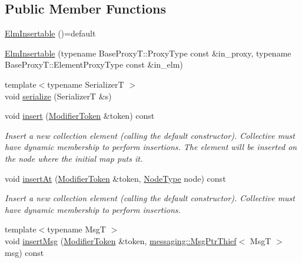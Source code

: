 \subsection*{Public Member Functions}
\begin{DoxyCompactItemize}
\item 
\hyperlink{structvt_1_1vrt_1_1collection_1_1_elm_insertable_a0a5528f369218ac386c4ab521bebffdd}{Elm\+Insertable} ()=default
\item 
\hyperlink{structvt_1_1vrt_1_1collection_1_1_elm_insertable_adbe57f67f3d9648a9ec8434ecdde0bd6}{Elm\+Insertable} (typename Base\+Proxy\+T\+::\+Proxy\+Type const \&in\+\_\+proxy, typename Base\+Proxy\+T\+::\+Element\+Proxy\+Type const \&in\+\_\+elm)
\item 
{\footnotesize template$<$typename SerializerT $>$ }\\void \hyperlink{structvt_1_1vrt_1_1collection_1_1_elm_insertable_a5d4a505bd59521679dd69cf835c67f85}{serialize} (SerializerT \&s)
\item 
void \hyperlink{structvt_1_1vrt_1_1collection_1_1_elm_insertable_a194756166f6728c3992f08b1bbf72ee1}{insert} (\hyperlink{structvt_1_1vrt_1_1collection_1_1_modifier_token}{Modifier\+Token} \&token) const
\begin{DoxyCompactList}\small\item\em Insert a new collection element (calling the default constructor). Collective must have dynamic membership to perform insertions. The element will be inserted on the node where the initial map puts it. \end{DoxyCompactList}\item 
void \hyperlink{structvt_1_1vrt_1_1collection_1_1_elm_insertable_a8168a56c77a86deb5715afab7f0ee975}{insert\+At} (\hyperlink{structvt_1_1vrt_1_1collection_1_1_modifier_token}{Modifier\+Token} \&token, \hyperlink{namespacevt_a866da9d0efc19c0a1ce79e9e492f47e2}{Node\+Type} node) const
\begin{DoxyCompactList}\small\item\em Insert a new collection element (calling the default constructor). Collective must have dynamic membership to perform insertions. \end{DoxyCompactList}\item 
{\footnotesize template$<$typename MsgT $>$ }\\void \hyperlink{structvt_1_1vrt_1_1collection_1_1_elm_insertable_a351f125473009c6a1d3382aee113e4ae}{insert\+Msg} (\hyperlink{structvt_1_1vrt_1_1collection_1_1_modifier_token}{Modifier\+Token} \&token, \hyperlink{structvt_1_1messaging_1_1_msg_ptr_thief}{messaging\+::\+Msg\+Ptr\+Thief}$<$ MsgT $>$ msg) const

\end{DoxyCompactItemize}
